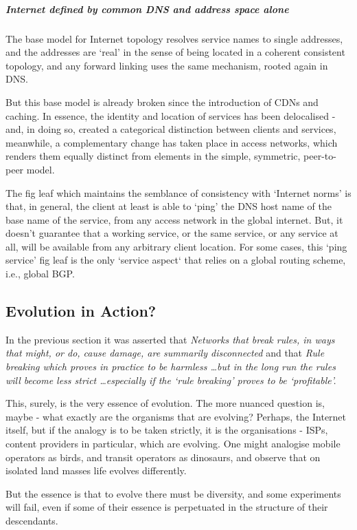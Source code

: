  \subparagraph{Internet defined by common DNS and address space alone}

 The base model for Internet topology resolves service names to single addresses, and the addresses are `real' in the sense of being located in a coherent consistent topology, and any forward linking uses the same mechanism, rooted again in DNS.

 But this base model is already broken since the introduction of CDNs and caching.  In essence, the identity and location of services has been delocalised - and, in doing so, created a categorical distinction between clients and services, meanwhile, a complementary change has taken place in access networks, which renders them equally distinct from elements in the simple, symmetric, peer-to-peer model.

 The fig leaf which maintains the semblance of consistency with `Internet norms' is that, in general, the client at least is able to `ping' the DNS host name of the base name of the service, from any access network in the global internet.  But, it doesn't guarantee that a working service, or the same service, or any service at all, will be available from any arbitrary client location.  For some cases, this `ping service' fig leaf is the only `service aspect` that relies on a global routing scheme, i.e., global BGP.

 \subsection{Evolution in Action?}
 In the previous section it was asserted  that \textit{Networks that break rules, in ways that might, or do, cause damage, are summarily disconnected}  and that \textit{Rule breaking which proves in practice to be harmless \ldots but in the long run the rules will become less strict \ldots especially if the `rule breaking' proves to be `profitable'.}

 This, surely, is the very essence of evolution.  The more nuanced question is, maybe - what exactly are the organisms that are evolving?  Perhaps, the Internet itself, but if the analogy is to be taken strictly, it is the organisations - ISPs, content providers in particular, which are evolving.  One might analogise mobile operators as birds, and transit operators as dinosaurs, and observe that on isolated land masses life evolves differently.

 But the essence is that to evolve there must be diversity, and some experiments will fail, even if some of their essence is perpetuated in the structure of their descendants.

